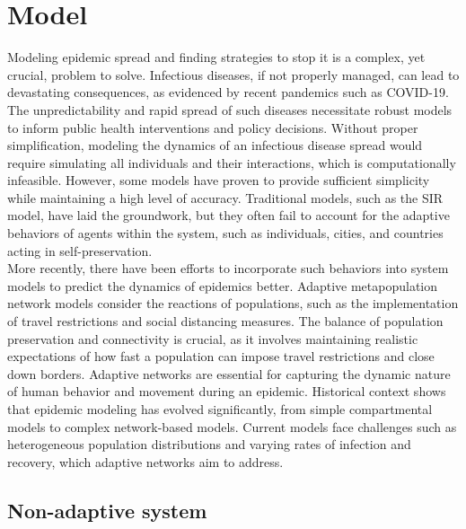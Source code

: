 % 

\section{Model}
Modeling epidemic spread and finding strategies to stop it is a complex, yet crucial, problem to solve. Infectious diseases, if not properly managed, can lead to devastating consequences, as evidenced by recent pandemics such as COVID-19. The unpredictability and rapid spread of such diseases necessitate robust models to inform public health interventions and policy decisions\cite{calvetti2020metapopulation}. Without proper simplification, modeling the dynamics of an infectious disease spread would require simulating all individuals and their interactions, which is computationally infeasible. However, some models have proven to provide sufficient simplicity while maintaining a high level of accuracy. Traditional models, such as the SIR model, have laid the groundwork, but they often fail to account for the adaptive behaviors of agents within the system, such as individuals, cities, and countries acting in self-preservation\cite{anupriya2022modelling}.\\ %

More recently, there have been efforts to incorporate such behaviors into system models to predict the dynamics of epidemics better. Adaptive metapopulation network models consider the reactions of populations, such as the implementation of travel restrictions and social distancing measures. The balance of population preservation and connectivity is crucial, as it involves maintaining realistic expectations of how fast a population can impose travel restrictions and close down borders. Adaptive networks are essential for capturing the dynamic nature of human behavior and movement during an epidemic\cite{bajardi2011human}. Historical context shows that epidemic modeling has evolved significantly, from simple compartmental models to complex network-based models. Current models face challenges such as heterogeneous population distributions and varying rates of infection and recovery, which adaptive networks aim to address.%

\subsection{Non-adaptive system}
